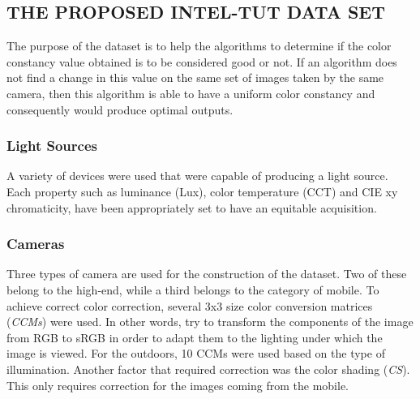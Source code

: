 \subsection{THE PROPOSED INTEL-TUT DATA SET}
The purpose of the dataset is to help the algorithms to determine if the color 
constancy value obtained is to be considered good or not. If an algorithm 
does not find a change in this value on the same set of images taken by the 
same camera, then this algorithm is able to have a uniform color constancy 
and consequently would produce optimal outputs.

\subsubsection{Light Sources}
A variety of devices were used that were capable of producing a light source. 
Each property such as luminance (Lux), color temperature (CCT) and CIE 
xy chromaticity, have been appropriately set to have an equitable acquisition.

\subsubsection{Cameras}
Three types of camera are used for the construction of the dataset. Two 
of these belong to the high-end, while a third belongs to the category of 
mobile. To achieve correct color correction, several 3x3 size color 
conversion matrices (\emph{CCMs}) were used. In other words, try to transform 
the components of the image from RGB to sRGB in order to adapt them to 
the lighting under which the image is viewed. For the outdoors, 10 CCMs 
were used based on the type of illumination. Another factor that required 
correction was the color shading (\emph{CS}). This only requires correction for the 
images coming from the mobile.

